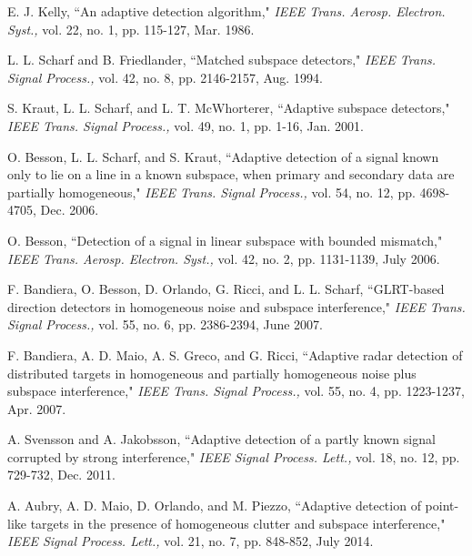 \begin{thebibliography}{12}

E. J. Kelly, ``An adaptive detection algorithm," \emph{IEEE Trans. Aerosp. Electron. Syst.,} vol. 22, no. 1, pp. 115-127, Mar. 1986.


L. L. Scharf and B. Friedlander, ``Matched subspace detectors," \emph{IEEE Trans. Signal Process.,} vol. 42, no. 8, pp. 2146-2157, Aug. 1994.

S. Kraut, L. L. Scharf, and L. T. McWhorterer, ``Adaptive subspace detectors," \emph{IEEE Trans. Signal Process.,} vol. 49, no. 1, pp. 1-16, Jan. 2001.

O. Besson, L. L. Scharf, and S. Kraut, ``Adaptive detection of a signal known only to lie
on a line in a known subspace, when primary and secondary data are partially homogeneous,"
 \emph{IEEE Trans. Signal Process.,} vol. 54, no. 12, pp. 4698-4705, Dec. 2006.

 O. Besson, ``Detection of a signal in linear subspace with bounded mismatch," \emph{IEEE Trans. Aerosp. Electron. Syst.,} vol. 42,
no. 2, pp. 1131-1139, July 2006.

F. Bandiera, O. Besson, D. Orlando, G. Ricci, and L. L. Scharf, ``GLRT-based direction detectors in homogeneous noise and subspace interference," \emph{IEEE Trans. Signal Process.,} vol. 55, no. 6, pp. 2386-2394, June 2007.

F. Bandiera, A. D. Maio, A. S. Greco, and G. Ricci, ``Adaptive radar detection of distributed targets in homogeneous and partially homogeneous
noise plus subspace interference," \emph{IEEE Trans. Signal Process.,} vol. 55, no. 4, pp. 1223-1237, Apr. 2007.

A. Svensson and A. Jakobsson, ``Adaptive
detection of a partly known signal corrupted by strong interference," \emph{IEEE Signal Process. Lett.,} vol. 18, no. 12, pp. 729-732, Dec. 2011.

A. Aubry, A. D. Maio, D. Orlando, and M. Piezzo, ``Adaptive
detection of
point-like targets in the presence of homogeneous clutter and subspace interference," \emph{IEEE Signal Process. Lett.,} vol. 21, no. 7,
pp. 848-852, July 2014.


\end{thebibliography}
